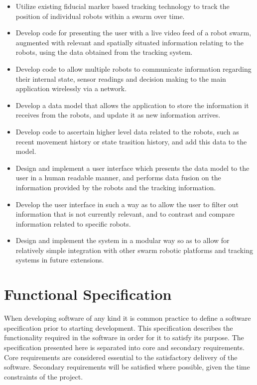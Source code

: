 \begin{itemize}
	\item Utilize existing fiducial marker based tracking technology to track the position of individual robots within a swarm over time.
	\item Develop code for presenting the user with a live video feed of a robot swarm, augmented with relevant and spatially situated information relating to the robots, using the data obtained from the tracking system.
	\item Develop code to allow multiple robots to communicate information regarding their internal state, sensor readings and decision making to the main application wirelessly via a network.
	\item Develop a data model that allows the application to store the information it receives from the robots, and update it as new information arrives.
	\item Develop code to ascertain higher level data related to the robots, such as recent movement history or state trasition history, and add this data to the model.
	\item Design and implement a user interface which presents the data model to the user in a human readable manner, and performs data fusion on the information provided by the robots and the tracking information.
	\item Develop the user interface in such a way as to allow the user to filter out information that is not currently relevant, and to contrast and compare information related to specific robots.
	\item Design and implement the system in a modular way so as to allow for relatively simple integration with other swarm robotic platforms and tracking systems in future extensions.
\end{itemize}


\section{Functional Specification}
When developing software of any kind it is common practice to define a software specification prior to starting development. This specification describes the functionality required in the software in order for it to satisfy its purpose. The specification presented here is separated into core and secondary requirements. Core requirements are considered essential to the satisfactory delivery of the software. Secondary requirements will be satisfied where possible, given the time constraints of the project.

